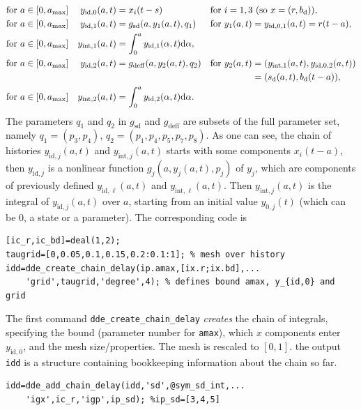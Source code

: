 \documentclass[10pt]{scrartcl}
\renewcommand{\d}{\mathrm{d}}
\newcommand{\blist}[1]{\mbox{\lstinline!#1!}}
\begin{document}
\begin{align*}
  \mbox{for\ }a\in[0,a_{\max}]&&y_{\mathrm{id},0}(a,t)&=x_i(t-s)&&\mbox{for $i=1,3$ (so $x=(r,b_\mathrm{d})$),}\\
  \mbox{for\ }a\in[0,a_{\max}]&&  y_{\mathrm{id},1}(a,t)&=g_\mathrm{sd}(a,y_1(a,t),q_1)&&\mbox{for $y_1(a,t)=y_{\mathrm{id},0,1}(a,t)=r(t-a)$,}\\
  \mbox{for\ }a\in[0,a_{\max}]&&  y_{\mathrm{int},1}(a,t)&=\int_0^a y_{\mathrm{id},1}(\alpha,t)\d \alpha,\\
  \mbox{for\ }a\in[0,a_{\max}]&&  y_{\mathrm{id},2}(a,t)&=g_\mathrm{deff}(a,y_2(a,t),q_2)&&\mbox{for $y_2(a,t)=(y_{\mathrm{int},1}(a,t),y_{\mathrm{id,0,2}}(a,t))$}\\
  &&&&&\mbox{\phantom{for\ }$\phantom{y_2(t,a)}=(s_\mathrm{d}(a,t),b_\mathrm{d}(t-a))$,}\\
  \mbox{for\ }a\in[0,a_{\max}]&&  y_{\mathrm{int},2}(a,t)&=\int_0^a y_{\mathrm{id},2}(\alpha,t)\d \alpha.  
\end{align*}
The parameters $q_1$ and $q_2$ in $g_\mathrm{sd}$ and
$g_\mathrm{deff}$ are subsets of the full parameter set, namely
$q_1=(p_3,p_4)$, $q_2=(p_1,p_4,p_5,p_7,p_8)$.  As one can see, the chain of
histories $y_{\mathrm{id},j}(a,t)$ and $y_{\mathrm{int},j}(a,t)$
starts with some components $x_i(t-a)$, then $y_{\mathrm{id},j}$ is a
nonlinear function $g_j(a, y_j(a,t),p_j)$ of $y_j$, which are
components of previously defined $y_{\mathrm{id},\ell}(a,t)$ and
$y_{\mathrm{int},\ell}(a,t)$. Then $y_{\mathrm{int},j}(a,t)$ is the
integral of $y_{\mathrm{id},j}(a,t)$ over $a$, starting from an
initial value $y_{0,j}(t)$ (which can be $0$, a state or a
parameter). The corresponding code is
\begin{lstlisting}
[ic_r,ic_bd]=deal(1,2);
taugrid=[0,0.05,0.1,0.15,0.2:0.1:1]; % mesh over history
idd=dde_create_chain_delay(ip.amax,[ix.r;ix.bd],...
    'grid',taugrid,'degree',4); % defines bound amax, y_{id,0} and grid
\end{lstlisting}
The first command \blist{dde_create_chain_delay} \emph{creates} the
chain of integrals, specifying the bound (parameter number for
\blist{amax}), which $x$ components enter $y_{\mathrm{id},0}$, and the
mesh size/properties. The mesh is rescaled to $[0,1]$. the output
\blist{idd} is a structure containing bookkeeping information about
the chain so far.
\begin{lstlisting}
idd=dde_add_chain_delay(idd,'sd',@sym_sd_int,...
    'igx',ic_r,'igp',ip_sd); %ip_sd=[3,4,5]  
\end{lstlisting}
\end{document}
